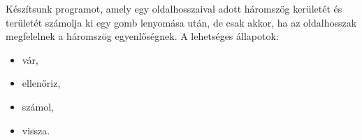 \documentclass[../../main.tex]{subfiles}
\begin{document}
Készítsunk programot, amely egy oldalhosszaival adott háromszög kerületét
és területét számolja ki egy gomb lenyomása után, de csak akkor, ha az
oldalhosszak megfelelnek a háromszög egyenlőségnek. A lehetséges állapotok:
\begin{multicols}{4}
  \begin{itemize}
    \item vár,
    \item ellenőriz,
    \item számol,
    \item vissza.
  \end{itemize}
\end{multicols}
\end{document}
